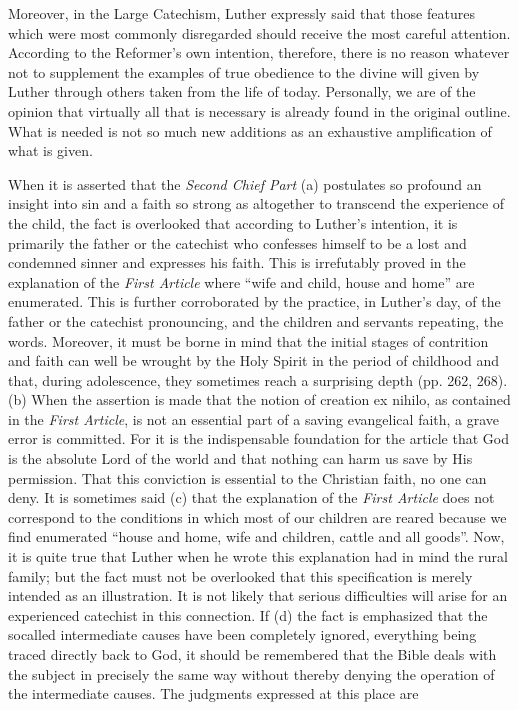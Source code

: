 Moreover, in the Large Catechism, Luther expressly said that those features which were most commonly disregarded should receive the most careful attention. According to the Reformer’s own intention, therefore, there is no reason whatever not to supplement the examples of true obedience to the divine will given by Luther through others taken from the life of today. Personally, we are of the opinion that virtually all that is necessary is already found in the original outline. What is needed is not so much new additions as an exhaustive amplification of what is given.

When it is asserted that the \emph{Second Chief Part} (a) postulates so profound an insight into sin and a faith so strong as altogether to transcend the experience of the child, the fact is overlooked that according to Luther’s intention, it is primarily the father or the catechist who confesses himself to be a lost and condemned sinner and expresses his faith. This is irrefutably proved in the explanation of the \emph{First Article} where “wife and child, house and home” are enumerated. This is further corroborated by the practice, in Luther’s day, of the father or the catechist pronouncing, and the children and servants repeating, the words. Moreover, it must be borne in mind that the initial stages of contrition and faith can well be wrought by the Holy Spirit in the period of childhood and that, during adolescence, they sometimes reach a surprising depth (pp. 262, 268). (b) When the assertion is made that the notion of creation ex nihilo, as contained in the \emph{First Article}, is not an essential part of a saving evangelical faith, a grave error is committed. For it is the indispensable foundation for the article that God is the absolute Lord of the world and that nothing can harm us save by His permission. That this conviction is essential to the Christian faith, no one can deny. It is sometimes said (c) that the explanation of the \emph{First Article} does not correspond to the conditions in which most of our children are reared because we find enumerated “house and home, wife and children, cattle and all goods”. Now, it is quite true that Luther when he wrote this explanation had in mind the rural family; but the fact must not be overlooked that this specification is merely intended as an illustration. It is not likely that serious difficulties will arise for an experienced catechist in this connection. If (d) the fact is emphasized that the socalled intermediate causes have been completely ignored, everything being traced directly back to God, it should be remembered that the Bible deals with the subject in precisely the same way without thereby denying the operation of the intermediate causes. The judgments expressed at this place are
